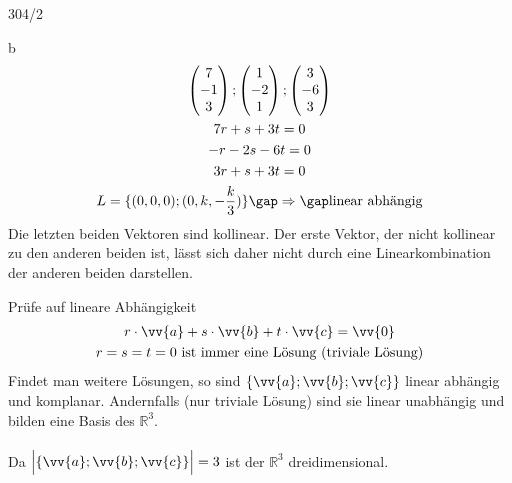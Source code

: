 \begin{exercise}{304/2}
  \item [b]
  \begin{gather*}
    \begin{pmatrix}7 \\ -1 \\ 3\end{pmatrix}; \begin{pmatrix}1 \\ -2 \\ 1\end{pmatrix}; \begin{pmatrix}3 \\ -6 \\ 3\end{pmatrix} \\
    7r + s + 3t = 0 \\
    -r - 2s -6t = 0 \\
    3r + s + 3t = 0 \\
    L = \{(0, 0, 0); (0, k, -\frac{k}{3})\} \gap\Rightarrow\gap \text{linear abhängig}
  \end{gather*}
  Die letzten beiden Vektoren sind kollinear. Der erste Vektor, der nicht kollinear zu den anderen beiden ist, lässt sich daher nicht durch eine Linearkombination der anderen beiden darstellen.
\end{exercise}
Prüfe auf lineare Abhängigkeit
\begin{gather*}
  r \cdot \vv{a} + s \cdot \vv{b} + t \cdot \vv{c} = \vv{0} \\
  r = s = t = 0 \text{ ist immer eine Lösung (triviale Lösung)}
\end{gather*}
Findet man weitere Lösungen, so sind $\{\vv{a}; \vv{b}; \vv{c}\}$ linear abhängig und komplanar. Andernfalls (nur triviale Lösung) sind sie linear unabhängig und bilden eine Basis des $\mathbb{R}^3$. \\\\
Da $\Bigl|\left\{\vv{a}; \vv{b}; \vv{c}\right\}\Bigr| = 3$ ist der $\mathbb{R}^3$ dreidimensional.
